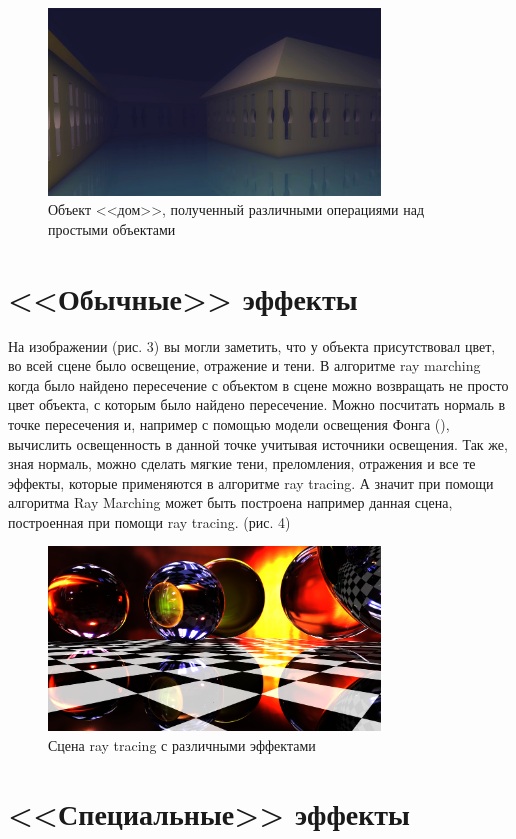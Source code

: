 \documentclass[14pt]{matmex-diploma}
\begin{document}
\begin{figure}[h]
\label{house}
\centering
\includegraphics[width = 250pt]{house.jpg}
\caption{Объект <<дом>>, полученный различными операциями над простыми объектами}
\end{figure}

\section{<<Обычные>> эффекты}

На изображении (рис. 3) вы могли заметить, что у объекта присутствовал цвет, во всей сцене было освещение, отражение и тени.
В алгоритме ray marching когда было найдено пересечение с объектом в сцене можно возвращать не просто цвет объекта, с которым было найдено пересечение.
Можно посчитать нормаль в точке пересечения и, например с помощью модели освещения Фонга (\cite{wiki:fong}), вычислить освещенность в данной
точке учитывая источники освещения. Так же, зная нормаль, можно сделать мягкие тени, преломления, отражения и все те эффекты,
которые применяются в алгоритме ray tracing. А значит при помощи алгоритма Ray Marching может быть построена например данная сцена, построенная
при помощи ray tracing. (рис. 4)

\begin{figure}[h]
\label{ray tracing}
\centering
\includegraphics[width = 250pt]{scene.png}
\caption{Сцена ray tracing с различными эффектами}
\end{figure}

\section{<<Специальные>> эффекты}
\end{document}

